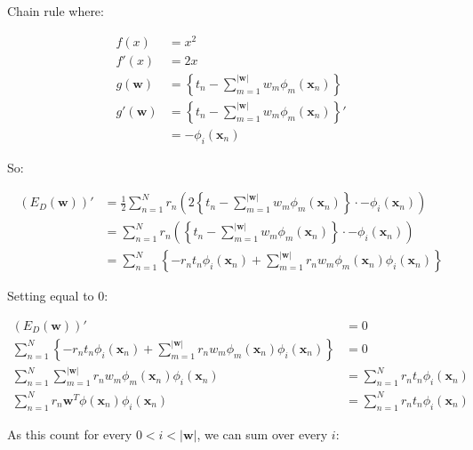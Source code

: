 Chain rule where:

\begin{align*}
  f(x)  &= x^2\\
  f'(x) &= 2x\\
  g(\textbf{w})  &= \left\{t_n-\sum_{m=1}^{|\textbf{w}|}
                    w_m \phi_m(\textbf{x}_n)\right\}\\
  g'(\textbf{w}) &= \left\{t_n-\sum_{m=1}^{|\textbf{w}|}
                    w_m \phi_m(\textbf{x}_n)\right\}'\\
                 &= -\phi_i(\textbf{x}_n)
\end{align*}

So:

\begin{align*}
  (E_D(\textbf{w}))' &= \frac{1}{2} \sum_{n=1}^{N}
                        r_n \left(2 \left\{
                        t_n-\sum_{m=1}^{|\textbf{w}|}
                        w_m \phi_m(\textbf{x}_n)
                        \right\} \cdot
                        -\phi_i(\textbf{x}_n)\right)\\
                     &= \sum_{n=1}^{N} r_n \left(
                        \left\{t_n-\sum_{m=1}^{|\textbf{w}|}
                        w_m \phi_m(\textbf{x}_n)
                        \right\} \cdot
                        -\phi_i(\textbf{x}_n)\right)\\
                     &= \sum_{n=1}^{N}
                        \left\{-r_n t_n\phi_i(\textbf{x}_n)
                        + \sum_{m=1}^{|\textbf{w}|}
                        r_n w_m \phi_m
                        (\textbf{x}_n)\phi_i
                        (\textbf{x}_n)\right\}
\end{align*}

Setting equal to $0$:

\begin{align*}
  (E_D(\textbf{w}))'           &= 0\\
  \sum_{n=1}^{N} \left\{-r_n t_n\phi_i(\textbf{x}_n)
  + \sum_{m=1}^{|\textbf{w}|} r_n w_m \phi_m(\textbf{x}_n)
  \phi_i(\textbf{x}_n)\right\} &= 0\\
  \sum_{n=1}^{N} \sum_{m=1}^{|\textbf{w}|} r_n w_m
  \phi_m(\textbf{x}_n)
  \phi_i(\textbf{x}_n) &= \sum_{n=1}^{N} r_n
  t_n\phi_i(\textbf{x}_n)\\
  \sum_{n=1}^{N} r_n \textbf{w}^T \phi(\textbf{x}_n)
  \phi_i(\textbf{x}_n) &= \sum_{n=1}^{N} r_n
  t_n\phi_i(\textbf{x}_n)
\end{align*}

As this count for every $0 < i < |\textbf{w}|$,
we can sum over every $i$:

